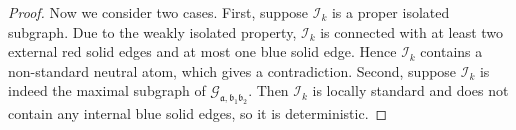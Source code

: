 \documentclass{article}
\newcommand{\1}{\mathds{1}}
\numberwithin{equation}{section}
\newcommand{\fa}{{\mathfrak a}}
\newcommand{\fb}{{\mathfrak b}}
\renewcommand{\cal}{\mathcal}
\theoremstyle{plain} %
\theoremstyle{remark}
\newcommand{\cor}{\color{red}}
\newcommand{\Iso}{{\mathcal I}}
\begin{document}
\begin{proof}
Now we consider two cases. First, suppose $\Iso_k$ is a proper isolated subgraph. Due to the weakly isolated property, $\Iso_k$ is connected with at least two external red solid edges and at most one blue solid edge. Hence $\Iso_k$ contains a non-standard neutral atom, which gives a contradiction. Second, suppose $\Iso_k$ is indeed the maximal subgraph of $\cal G_{\fa,\fb_1\fb_2}$. Then $\Iso_k$ is locally standard and does  not contain any internal blue solid edges, so it is deterministic.
%	
%		
\end{proof}
\end{document}
